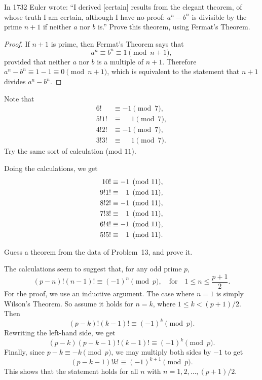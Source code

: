  In 1732 Euler wrote: ``I derived [certain] results from
the elegant theorem, of whose truth I am certain, although I have no
proof: $a^n - b^n$ is divisible by the prime $n + 1$ if neither $a$
nor $b$ is.'' Prove this theorem, using Fermat's Theorem.
\begin{proof}
  If $n + 1$ is prime, then Fermat's Theorem says that
  \begin{equation*}
    a^n\equiv b^n\equiv1\pmod{n+1},
  \end{equation*}
  provided that neither $a$ nor $b$ is a multiple of $n+1$. Therefore
  $a^n - b^n\equiv1 - 1\equiv0\pmod{n+1}$, which is equivalent to the
  statement that $n+1$ divides $a^n - b^n$.
\end{proof}

 Note that
\begin{align*}
  6! &\equiv -1 \pmod7, \\
  5!1! &\equiv \phantom{-}1 \pmod7, \\
  4!2! &\equiv -1 \pmod7, \\
  3!3! &\equiv \phantom{-}1 \pmod7.
\end{align*}
Try the same sort of calculation (mod $11$).
\begin{solution}
  Doing the calculations, we get
  \begin{align*}
    10! &\equiv -1\pmod{11}, \\
    9!1! &\equiv \phantom{-}1\pmod{11}, \\
    8!2! &\equiv -1\pmod{11}, \\
    7!3! &\equiv \phantom{-}1\pmod{11}, \\
    6!4! &\equiv -1\pmod{11}, \\
    5!5! &\equiv \phantom{-}1\pmod{11}. \qedhere
  \end{align*}
\end{solution}

 Guess a theorem from the data of Problem~13, and prove
it.
\begin{solution}
  The calculations seem to suggest that, for any odd prime $p$,
  \begin{equation*}
    (p - n)!(n - 1)! \equiv (-1)^n \pmod{p},
    \quad\text{for}\quad
    1\leq n\leq\frac{p+1}2.
  \end{equation*}
  For the proof, we use an inductive argument. The case where $n = 1$
  is simply Wilson's Theorem. So assume it holds for $n = k$, where
  $1\leq k<(p+1)/2$. Then
  \begin{equation*}
    (p - k)!(k - 1)! \equiv (-1)^k \pmod{p}.
  \end{equation*}
  Rewriting the left-hand side, we get
  \begin{equation*}
    (p - k)(p - k - 1)!(k - 1)! \equiv (-1)^k\pmod{p}.
  \end{equation*}
  Finally, since $p - k \equiv -k\pmod{p}$, we may multiply both sides
  by $-1$ to get
  \begin{equation*}
    (p - k - 1)!k! \equiv (-1)^{k+1}\pmod{p}.
  \end{equation*}
  This shows that the statement holds for all $n$ with
  $n = 1, 2, \dots, (p+1)/2$.
\end{solution}

